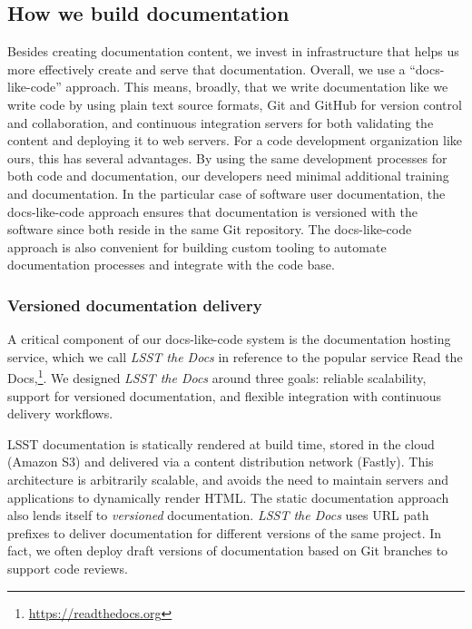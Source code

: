 \subsection{How we build documentation}
\label{sec:doc_builds}

Besides creating documentation content, we invest in infrastructure that helps us more effectively create and serve that documentation.
Overall, we use a ``docs-like-code'' approach.\cite{Gentle:2017}
This means, broadly, that we write documentation like we write code by using plain text source formats, Git and GitHub for version control and collaboration, and continuous integration servers for both validating the content and deploying it to web servers.
For a code development organization like ours, this has several advantages.
By using the same development processes for both code and documentation, our developers need minimal additional training and documentation.
In the particular case of software user documentation, the docs-like-code approach ensures that documentation is versioned with the software since both reside in the same Git repository.
The docs-like-code approach is also convenient for building custom tooling to automate documentation processes and integrate with the code base.

\subsubsection{Versioned documentation delivery}
\label{sec:ltd}

A critical component of our docs-like-code system is the documentation hosting service, which we call \textit{LSST the Docs}\cite{SQR-006} in reference to the popular service Read the Docs,\footnote{\url{https://readthedocs.org}}.
We designed \textit{LSST the Docs} around three goals: reliable scalability, support for versioned documentation, and flexible integration with continuous delivery workflows.

LSST documentation is statically rendered at build time, stored in the cloud (Amazon S3) and delivered via a content distribution network (Fastly).
This architecture is arbitrarily scalable, and avoids the need to maintain servers and applications to dynamically render HTML.
The static documentation approach also lends itself to \emph{versioned} documentation.
\textit{LSST the Docs} uses URL path prefixes to deliver documentation for different versions of the same project.
In fact, we often deploy draft versions of documentation based on Git branches to support code reviews.

